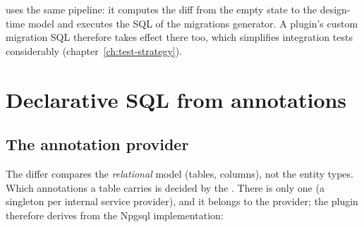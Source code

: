 \begin{note}
   uses the same
  pipeline: it computes the diff from the empty state to the design-time model and executes
  the SQL of the migrations generator. A plugin's custom migration SQL therefore takes
  effect there too, which simplifies integration tests considerably
  (chapter~\ref{ch:test-strategy}).
\end{note}

\chapter{Declarative SQL from annotations}\label{ch:declarative-sql-from-annotations}

\section{The annotation provider}

The differ compares the \emph{relational} model (tables, columns), not the entity types.
Which annotations a table carries is decided by the
. There is only one (a
singleton per internal service provider), and it belongs to the provider; the plugin therefore derives from the Npgsql implementation:


